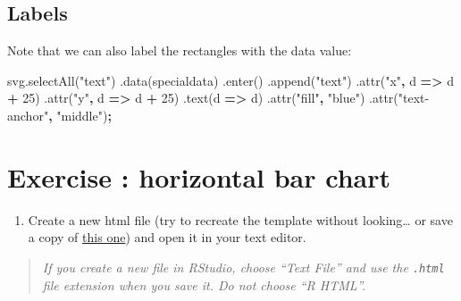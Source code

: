 \documentclass[openany]{book}
\newenvironment{Shaded}{\begin{snugshade}}{\end{snugshade}}
\newcommand{\AttributeTok}[1]{\textcolor[rgb]{0.77,0.63,0.00}{#1}}
\newcommand{\DecValTok}[1]{\textcolor[rgb]{0.00,0.00,0.81}{#1}}
\newcommand{\NormalTok}[1]{#1}
\newcommand{\OperatorTok}[1]{\textcolor[rgb]{0.81,0.36,0.00}{\textbf{#1}}}
\newcommand{\StringTok}[1]{\textcolor[rgb]{0.31,0.60,0.02}{#1}}
\newcommand{\VariableTok}[1]{\textcolor[rgb]{0.00,0.00,0.00}{#1}}
\providecommand{\tightlist}{%
  \setlength{\itemsep}{0pt}\setlength{\parskip}{0pt}}
\begin{document}
\hypertarget{labels}{%
\subsection{Labels}\label{labels}}

Note that we can also label the rectangles with the data value:

\begin{Shaded}
\begin{Highlighting}[]
  \VariableTok{svg}\NormalTok{.}\AttributeTok{selectAll}\NormalTok{(}\StringTok{"text"}\NormalTok{)}
\NormalTok{      .}\AttributeTok{data}\NormalTok{(specialdata)}
\NormalTok{      .}\AttributeTok{enter}\NormalTok{()}
\NormalTok{      .}\AttributeTok{append}\NormalTok{(}\StringTok{"text"}\NormalTok{)}
\NormalTok{      .}\AttributeTok{attr}\NormalTok{(}\StringTok{"x"}\OperatorTok{,}\NormalTok{ d }\OperatorTok{=>}\NormalTok{ d }\OperatorTok{+} \DecValTok{25}\NormalTok{)}
\NormalTok{      .}\AttributeTok{attr}\NormalTok{(}\StringTok{"y"}\OperatorTok{,}\NormalTok{ d }\OperatorTok{=>}\NormalTok{ d }\OperatorTok{+} \DecValTok{25}\NormalTok{)}
\NormalTok{      .}\AttributeTok{text}\NormalTok{(d }\OperatorTok{=>}\NormalTok{ d)}
\NormalTok{      .}\AttributeTok{attr}\NormalTok{(}\StringTok{"fill"}\OperatorTok{,} \StringTok{"blue"}\NormalTok{)}
\NormalTok{      .}\AttributeTok{attr}\NormalTok{(}\StringTok{"text-anchor"}\OperatorTok{,} \StringTok{"middle"}\NormalTok{)}\OperatorTok{;}
\end{Highlighting}
\end{Shaded}

\hypertarget{exercise-horizontal-bar-chart}{%
\section{Exercise : horizontal bar chart}\label{exercise-horizontal-bar-chart}}

\begin{enumerate}
\def\labelenumi{\arabic{enumi}.}
\tightlist
\item
  Create a new html file (try to recreate the template without looking\ldots{} or save a copy of \href{https://raw.githubusercontent.com/jtr13/d3book/master/code/d3template.html}{this one}) and open it in your text editor.
\end{enumerate}

\begin{quote}
 \emph{If you create a new file in RStudio, choose ``Text File'' and use the \texttt{.html} file extension when you save it. Do not choose ``R HTML''.}
\end{quote}
\end{document}
